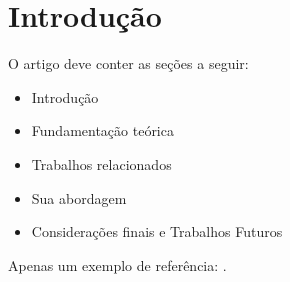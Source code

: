 \section{Introdução}
\label{sec:intro}

O artigo deve conter as seções a seguir:

\begin{itemize}
    \item Introdução
    \item Fundamentação teórica
    \item Trabalhos relacionados
    \item Sua abordagem
    \item Considerações finais e Trabalhos Futuros
\end{itemize}

Apenas um exemplo de referência: \cite{aurelio}.